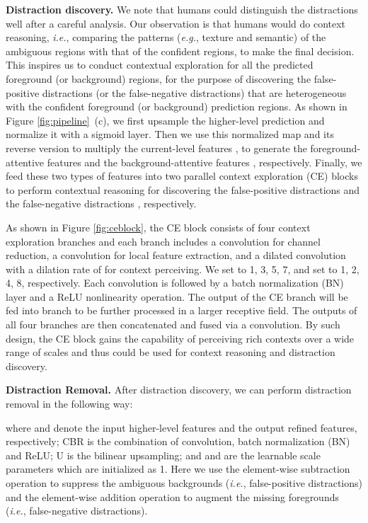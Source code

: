 \documentclass[final]{cvpr}
\begin{document}
\textbf{Distraction discovery.} We note that humans could distinguish the distractions well after a careful analysis. Our observation is that humans would do context reasoning, \emph{i.e.}, comparing the patterns (\emph{e.g.}, texture and semantic) of the ambiguous regions with that of the confident regions, to make the final decision. This inspires us to conduct contextual exploration for all the predicted foreground (or background) regions, for the purpose of discovering the false-positive distractions (or the false-negative distractions) that are heterogeneous with the confident foreground (or background) prediction regions.
As shown in Figure \ref{fig:pipeline}~(c), we first upsample the higher-level prediction and normalize it with a sigmoid layer. Then we use this normalized map and its reverse version to multiply the current-level features , to generate the foreground-attentive features  and the background-attentive features , respectively. Finally, we feed these two types of features into two parallel context exploration (CE) blocks to perform contextual reasoning for discovering the false-positive distractions  and the false-negative distractions , respectively.

As shown in Figure \ref{fig:ceblock}, the CE block consists of four context exploration branches and each branch includes a  convolution for channel reduction, a  convolution for local feature extraction, and a  dilated convolution with a dilation rate of  for context perceiving. We set  to 1, 3, 5, 7, and set  to 1, 2, 4, 8, respectively. Each convolution is followed by a batch normalization (BN) layer and a ReLU nonlinearity operation. The output of the  CE branch will be fed into  branch to be further processed in a larger receptive field. The outputs of all four branches are then concatenated and fused via a  convolution. By such design, the CE block gains the capability of perceiving rich contexts over a wide range of scales and thus could be used for context reasoning and distraction discovery.

\textbf{Distraction Removal.} After distraction discovery, we can perform distraction removal in the following way:

where  and  denote the input higher-level features and the output refined features, respectively; CBR is the combination of convolution, batch normalization (BN) and ReLU; U is the bilinear upsampling; and  and  are the learnable scale parameters which are initialized as 1. Here we use the element-wise subtraction operation to suppress the ambiguous backgrounds (\emph{i.e.}, false-positive distractions) and the element-wise addition operation to augment the missing foregrounds (\emph{i.e.}, false-negative distractions).
\end{document}
